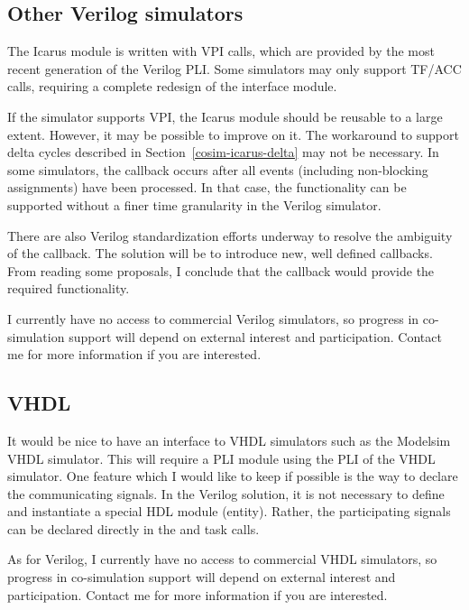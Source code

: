 \subsection{Other Verilog simulators \label{cosim-impl-verilog}}

The Icarus module is written with VPI calls, which are provided by the
most recent generation of the Verilog PLI. Some simulators may only
support TF/ACC calls, requiring a complete redesign of the interface
module.

If the simulator supports VPI, the Icarus module should be reusable to
a large extent. However, it may be possible to improve on it.  The
workaround to support delta cycles described in
Section~\ref{cosim-icarus-delta} may not be necessary. In some
simulators, the  callback occurs after all
events (including non-blocking assignments) have been processed. In
that case, the functionality can be supported without a finer time
granularity in the Verilog simulator.

There are also Verilog standardization efforts underway to resolve the
ambiguity of the  callback. The solution will be
to introduce new, well defined callbacks. From reading some proposals,
I conclude that the  callback would provide the
required functionality.

I currently have no access to commercial Verilog simulators, so
progress in co-simulation support will depend on external interest and
participation. Contact me for more information if you are interested.

\subsection{VHDL \label{cosim-impl-vhdl}}

It would be nice to have an interface to VHDL simulators such as the
Modelsim VHDL simulator. This will require a PLI module using the
PLI of the VHDL simulator. One feature which I would
like to keep if possible is the way to declare the communicating
signals.  In the Verilog solution, it is not necessary to define and
instantiate a special HDL module (entity). Rather, the participating
signals can be declared directly in the  and
 task calls.

As for Verilog, I currently have no access to commercial VHDL
simulators, so progress in co-simulation support will depend on
external interest and participation.  Contact me for more information
if you are interested.
